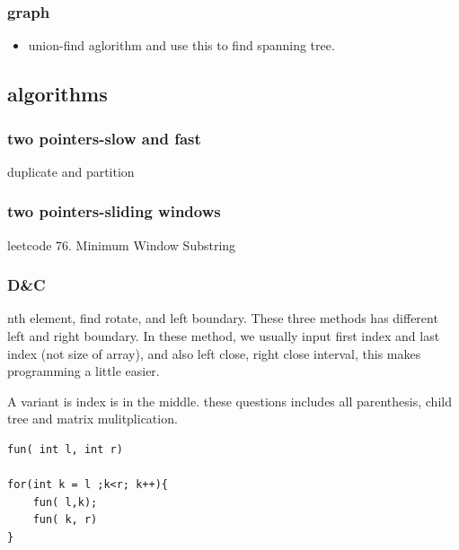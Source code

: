 \documentclass[a4paper,11pt,twoside]{book}
\begin{document}
\subsubsection{graph}

\begin{itemize}
	\item union-find aglorithm and use this to find spanning tree.
	
\end{itemize}

\subsection{algorithms}

\subsubsection{two pointers-slow and fast}
	\par duplicate and partition

\subsubsection{two pointers-sliding windows}
	\par leetcode 76. Minimum Window Substring

\subsubsection{D\&C}
	\par nth element, find rotate, and left boundary. These three methods has different left and right boundary.  In these method, we usually input first index and last index (not size of array), and also left close, right close interval, this makes programming a little easier. 
	
	\par A variant is index is in the middle. these questions includes all parenthesis, child tree and matrix mulitplication.
\begin{lstlisting}
fun( int l, int r)

for(int k = l ;k<r; k++){
	fun( l,k);
	fun( k, r)
}			
\end{lstlisting}	
\end{document}
